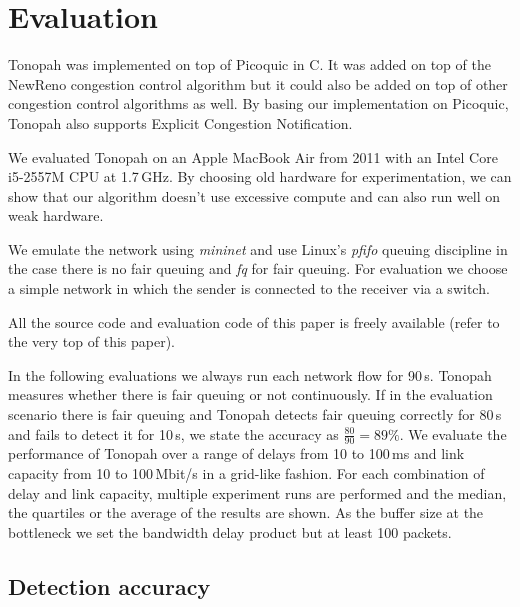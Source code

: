 \documentclass[conference]{IEEEtran}
\begin{document}
\section{Evaluation}

Tonopah was implemented on top of Picoquic in C. It was added on top of the NewReno congestion control algorithm but it could also be added on top of other 
congestion control algorithms as well. By basing our implementation on Picoquic, Tonopah also supports Explicit Congestion Notification. 

We evaluated Tonopah on an Apple MacBook Air from 2011 with an Intel Core i5-2557M CPU at 1.7\,GHz. 
By choosing old hardware for experimentation, we can show that our algorithm doesn't use excessive compute and can also run well on weak hardware. 

We emulate the network using \textit{mininet} and use Linux's \textit{pfifo} queuing discipline in the case there is no fair queuing and \textit{fq} for fair queuing. 
For evaluation we choose a simple network in which the sender is connected to the receiver via a switch. 

All the source code and evaluation code of this paper is freely available (refer to the very top of this paper). 

In the following evaluations we always run each network flow for 90\,s. Tonopah measures whether there is fair queuing or not continuously. 
If in the evaluation scenario there is fair queuing and Tonopah detects fair queuing correctly for 80\,s and fails to detect it for 10\,s, we 
state the accuracy as $\frac{80}{90} = 89\%$. 
We evaluate the performance of Tonopah over a range of delays from 10 to 100\,ms and link capacity from 10 to 100\,Mbit/s in a grid-like fashion. 
For each combination of delay and link capacity, multiple experiment runs are performed and the median, the quartiles or the average of the results are shown. 
As the buffer size at the bottleneck we set the bandwidth delay product but at least 100 packets. 

\subsection{Detection accuracy}
\end{document}

